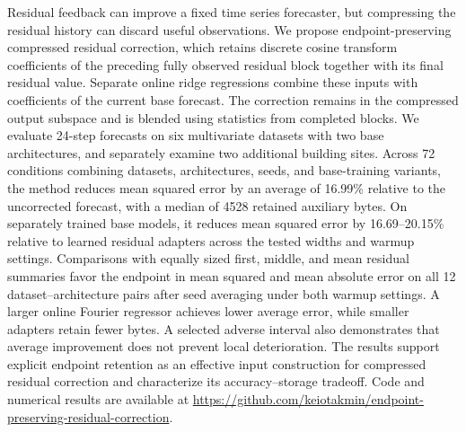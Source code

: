 Residual feedback can improve a fixed time series forecaster, but compressing the residual history can discard useful observations. We propose endpoint-preserving compressed residual correction, which retains discrete cosine transform coefficients of the preceding fully observed residual block together with its final residual value. Separate online ridge regressions combine these inputs with coefficients of the current base forecast. The correction remains in the compressed output subspace and is blended using statistics from completed blocks. We evaluate 24-step forecasts on six multivariate datasets with two base architectures, and separately examine two additional building sites. Across 72 conditions combining datasets, architectures, seeds, and base-training variants, the method reduces mean squared error by an average of 16.99\% relative to the uncorrected forecast, with a median of 4528 retained auxiliary bytes. On separately trained base models, it reduces mean squared error by 16.69--20.15\% relative to learned residual adapters across the tested widths and warmup settings. Comparisons with equally sized first, middle, and mean residual summaries favor the endpoint in mean squared and mean absolute error on all 12 dataset--architecture pairs after seed averaging under both warmup settings. A larger online Fourier regressor achieves lower average error, while smaller adapters retain fewer bytes. A selected adverse interval also demonstrates that average improvement does not prevent local deterioration. The results support explicit endpoint retention as an effective input construction for compressed residual correction and characterize its accuracy--storage tradeoff. Code and numerical results are available at \url{https://github.com/keiotakmin/endpoint-preserving-residual-correction}.
